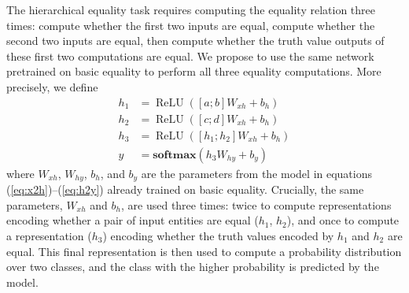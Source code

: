 \documentclass{article}
\newcommand{\eg}[1]{(\ref{#1})}
\newcommand{\dasheg}[2]{\eg{#1}--\eg{#2}}
\newcommand{\softmax}{\mathbf{softmax}}
\DeclareMathOperator{\ReLU}{ReLU}
\begin{document}
The hierarchical equality task requires computing the equality relation three times: compute whether the first two inputs are equal, compute whether the second two inputs are equal, then compute whether the truth value outputs of these first two computations are equal. We propose to use the same network pretrained on basic equality to perform all three equality computations.  More precisely, we define
%
\begin{align}
  h_1 &= \ReLU([a;b]W_{xh} + b_{h})\\
  h_2 &= \ReLU([c;d]W_{xh} + b_{h})\\
  h_3 &= \ReLU([h_1;h_2]W_{xh} + b_{h}) \\
  y &= \softmax(h_3W_{hy} + b_{y})
\end{align}
%
where $W_{xh}$, $W_{hy}$, $b_h$, and $b_y$ are the parameters from the model in equations \dasheg{eq:x2h}{eq:h2y} already trained on basic equality.  Crucially, the same parameters, $W_{xh}$ and $b_h$, are used three times: twice to compute representations encoding whether a pair of input entities are equal ($h_1$, $h_2$), and once to compute a representation ($h_{3}$) encoding whether the truth values encoded by $h_1$ and $h_2$ are equal. This final representation is then used to compute a probability distribution over two classes, and the class with the higher probability is predicted by the model.
\end{document}

